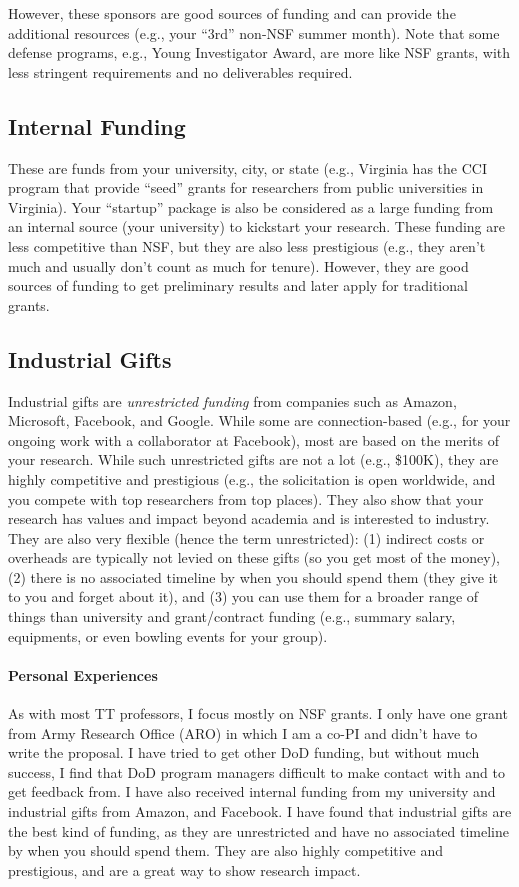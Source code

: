 \documentclass[oneside,11pt,dvipsnames]{book}
\begin{document}
However, these sponsors are good sources of funding and can provide the additional resources (e.g., your ``3rd'' non-NSF summer month). Note that some defense programs, e.g., Young Investigator Award, are more like NSF grants, with less stringent requirements and no deliverables required. 


\subsection{Internal Funding}\label{sec:internal}
These are funds from your university, city, or state (e.g., Virginia has the CCI program that provide ``seed'' grants for researchers from public universities in Virginia).  Your ``startup'' package is also be considered as a large funding from an internal source (your university) to kickstart your research. These funding are less competitive than NSF, but they are also less prestigious (e.g., they aren't much and usually don't count as much for tenure).  However, they are good sources of funding to get preliminary results and later apply for traditional grants.

\subsection{Industrial Gifts}
Industrial gifts are \emph{unrestricted funding} from companies such as Amazon, Microsoft, Facebook, and Google. While some are connection-based (e.g., for your ongoing work with a collaborator at Facebook), most are based on the merits of your research.
While such unrestricted gifts are not a lot (e.g., \$100K), they are highly competitive and prestigious (e.g., the solicitation is open worldwide, and you compete with top researchers from top places).  
They also show that your research has values and impact beyond academia and is interested to industry. 
They are also very flexible (hence the term unrestricted):  (1) indirect costs or overheads are typically not levied on these gifts (so you get most of the money), (2) there is no associated timeline by when you should spend them (they give it to you and forget about it), and (3) you can use them for a broader range of things than university and grant/contract funding (e.g., summary salary, equipments, or even bowling events for your group).

\paragraph{Personal Experiences}
As with most TT professors, I focus mostly on NSF grants.  I only have one grant from Army Research Office (ARO) in which I am a co-PI and didn't have to write the proposal. I have tried to get other DoD funding, but without much success, I find that DoD program managers difficult to make contact with and to get feedback from.  I have also received internal funding from my university and industrial gifts from Amazon, and Facebook.  I have found that industrial gifts are the best kind of funding, as they are unrestricted and have no associated timeline by when you should spend them.  They are also highly competitive and prestigious, and are a great way to show research impact.
\end{document}
